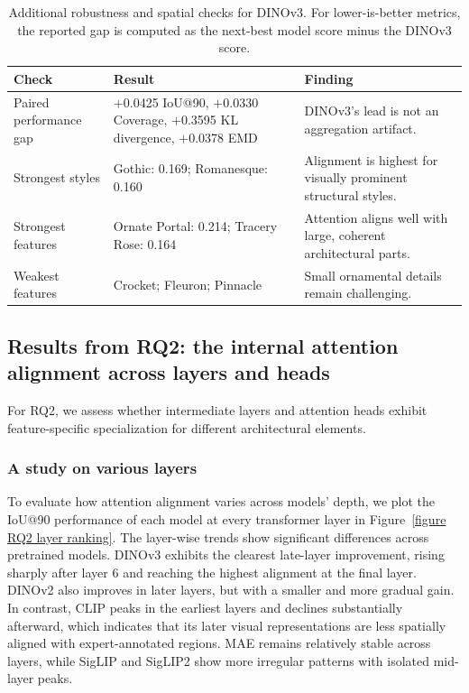 \documentclass[lineno,pdflatex,sn-mathphys-num]{sn-jnl}%
\theoremstyle{thmstyleone}%
\theoremstyle{thmstyletwo}%
\theoremstyle{thmstylethree}%
\begin{document}
\begin{table}[!h]
\centering
\caption{Additional robustness and spatial checks for DINOv3. For lower-is-better metrics, the reported gap is computed as the next-best model score minus the DINOv3 score.\label{table RQ1 dinov3}}
\begin{tabular}{lp{}p{}}
\toprule
Check & Result & Finding \\ \midrule
Paired performance gap & $+$0.0425 IoU@90, $+$0.0330 Coverage, $+$0.3595 KL divergence, $+$0.0378 EMD & DINOv3's lead is not an aggregation artifact. \\
Strongest styles & Gothic: 0.169; Romanesque: 0.160 & Alignment is highest for visually prominent structural styles. \\
Strongest features & Ornate Portal: 0.214; Tracery Rose: 0.164 & Attention aligns well with large, coherent architectural parts. \\
Weakest features & Crocket; Fleuron; Pinnacle & Small ornamental details remain challenging. \\
\bottomrule
\end{tabular}
\end{table}


\subsection{Results from RQ2: the internal attention alignment across layers and heads}

For RQ2, we assess whether intermediate layers and attention heads exhibit feature-specific specialization for different architectural elements. 

\subsubsection{A study on various layers}

To evaluate how attention alignment varies across models' depth, we plot the IoU@90 performance of each model at every transformer layer in Figure~\ref{figure RQ2 layer ranking}. The layer-wise trends show significant differences across pretrained models. DINOv3 exhibits the clearest late-layer improvement, rising sharply after layer 6 and reaching the highest alignment at the final layer. DINOv2 also improves in later layers, but with a smaller and more gradual gain. In contrast, CLIP peaks in the earliest layers and declines substantially afterward, which indicates that its later visual representations are less spatially aligned with expert-annotated regions. MAE remains relatively stable across layers, while SigLIP and SigLIP2 show more irregular patterns with isolated mid-layer peaks. 
\end{document}
